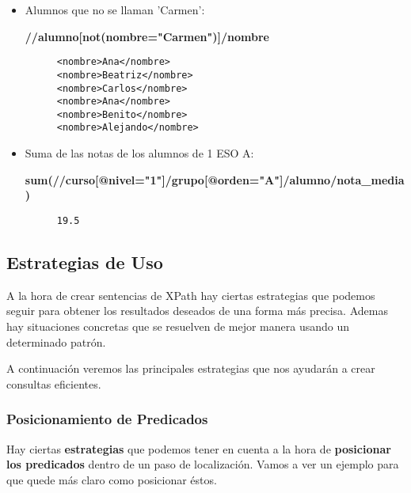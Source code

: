 \begin{itemize}
    \item Alumnos que no se llaman 'Carmen':

    \textbf{//alumno[not(nombre="Carmen")]/nombre}
     \begin{figure}[H]
        \begin{tcolorbox}[sharp corners, colback=yellow!30, colframe=white!20]
            \scriptsize
            \begin{verbatim}
<nombre>Ana</nombre>
<nombre>Beatriz</nombre>
<nombre>Carlos</nombre>
<nombre>Ana</nombre>
<nombre>Benito</nombre>
<nombre>Alejando</nombre>
            \end{verbatim}
        \end{tcolorbox}
    \end{figure}

    \item Suma de las notas de los alumnos de 1 ESO A:

    \textbf{sum(//curso[@nivel="1"]/grupo[@orden="A"]/alumno/nota\_media)}
     \begin{figure}[H]
    \begin{tcolorbox}[sharp corners, colback=yellow!30, colframe=white!20]
        \scriptsize
        \begin{verbatim}
19.5
        \end{verbatim}
    \end{tcolorbox}
    \end{figure}
\end{itemize}

\subsection{Estrategias de Uso}
A la hora de crear sentencias de XPath hay ciertas estrategias que podemos seguir para obtener los resultados deseados de una forma más precisa. Ademas hay situaciones concretas que se resuelven de mejor manera usando un determinado patrón.

A continuación veremos las principales estrategias que nos ayudarán a crear consultas eficientes.

\subsubsection{Posicionamiento de Predicados}

     Hay ciertas \textbf{estrategias} que podemos tener en cuenta a la hora de \textbf{posicionar los predicados} dentro de un paso de localización. Vamos a ver un ejemplo para que quede más claro como posicionar éstos.

